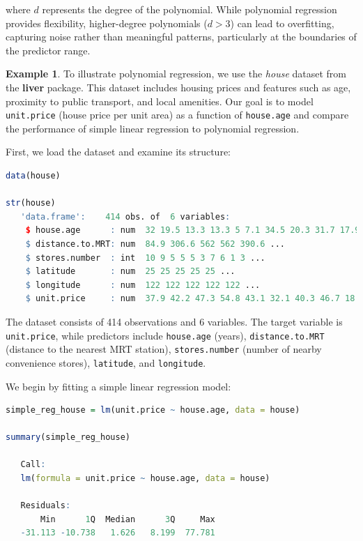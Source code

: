 \documentclass[
  11pt,
]{book}
\newcommand{\passthrough}[1]{#1}
\theoremstyle{definition}
\theoremstyle{definition}
\newtheorem{example}{Example}[chapter]
\theoremstyle{definition}
\theoremstyle{definition}
\theoremstyle{remark}
\begin{document}
where \(d\) represents the degree of the polynomial. While polynomial regression provides flexibility, higher-degree polynomials (\(d > 3\)) can lead to overfitting, capturing noise rather than meaningful patterns, particularly at the boundaries of the predictor range.

\begin{example}
\protect\hypertarget{exm:ex-polynomial-regression}{}\label{exm:ex-polynomial-regression}To illustrate polynomial regression, we use the \emph{house} dataset from the \textbf{liver} package. This dataset includes housing prices and features such as age, proximity to public transport, and local amenities. Our goal is to model \passthrough{\lstinline!unit.price!} (house price per unit area) as a function of \passthrough{\lstinline!house.age!} and compare the performance of simple linear regression to polynomial regression.

First, we load the dataset and examine its structure:

\begin{lstlisting}[language=R]
data(house)

str(house)
   'data.frame':    414 obs. of  6 variables:
    $ house.age      : num  32 19.5 13.3 13.3 5 7.1 34.5 20.3 31.7 17.9 ...
    $ distance.to.MRT: num  84.9 306.6 562 562 390.6 ...
    $ stores.number  : int  10 9 5 5 5 3 7 6 1 3 ...
    $ latitude       : num  25 25 25 25 25 ...
    $ longitude      : num  122 122 122 122 122 ...
    $ unit.price     : num  37.9 42.2 47.3 54.8 43.1 32.1 40.3 46.7 18.8 22.1 ...
\end{lstlisting}

The dataset consists of 414 observations and 6 variables. The target variable is \passthrough{\lstinline!unit.price!}, while predictors include \passthrough{\lstinline!house.age!} (years), \passthrough{\lstinline!distance.to.MRT!} (distance to the nearest MRT station), \passthrough{\lstinline!stores.number!} (number of nearby convenience stores), \passthrough{\lstinline!latitude!}, and \passthrough{\lstinline!longitude!}.

We begin by fitting a simple linear regression model:

\begin{lstlisting}[language=R]
simple_reg_house = lm(unit.price ~ house.age, data = house)

summary(simple_reg_house)
   
   Call:
   lm(formula = unit.price ~ house.age, data = house)
   
   Residuals:
       Min      1Q  Median      3Q     Max 
   -31.113 -10.738   1.626   8.199  77.781 
   

\end{lstlisting}
\end{example}
\end{document}
